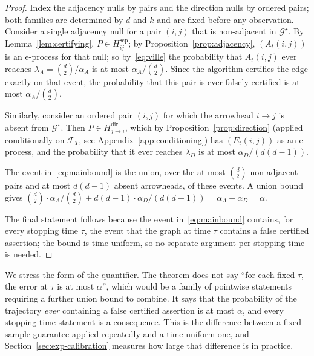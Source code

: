 \documentclass[pdflatex,sn-apa]{sn-jnl}
\theoremstyle{thmstyleone}%
\theoremstyle{thmstyletwo}%
\theoremstyle{thmstylethree}%
\newcommand{\Fcal}{\mathcal{F}}
\newcommand{\Gstar}{\mathcal{G}^{\star}}
\begin{document}
\begin{proof}
Index the adjacency nulls by pairs and the direction nulls by ordered pairs;
both families are determined by $d$ and $k$ and are fixed before any
observation. Consider a single adjacency null for a pair $(i,j)$ that is
non-adjacent in $\Gstar$. By Lemma~\ref{lem:certifying}, $P \in
H^{\mathrm{sep}}_{ij}$; by Proposition~\ref{prop:adjacency}, $(A_t(i,j))$ is
an e-process for that null; so by~\eqref{eq:ville} the probability that
$A_t(i,j)$ ever reaches $\lambda_A = \binom{d}{2}/\alpha_A$ is at most
$\alpha_A / \binom{d}{2}$. Since the algorithm certifies the edge exactly on
that event, the probability that this pair is ever falsely certified is at
most $\alpha_A/\binom{d}{2}$.

Similarly, consider an ordered pair $(i,j)$ for which the arrowhead $i \to j$
is absent from $\Gstar$. Then $P \in H^{\mathrm{dir}}_{j \to i}$, which by
Proposition~\ref{prop:direction} (applied conditionally on $\Fcal_T$, see
Appendix~\ref{app:conditioning}) has $(E_t(i,j))$ as an e-process, and the
probability that it ever reaches $\lambda_D$ is at most
$\alpha_D / (d(d-1))$.

The event in~\eqref{eq:mainbound} is the union, over the at most
$\binom{d}{2}$ non-adjacent pairs and at most $d(d-1)$ absent arrowheads, of
these events. A union bound gives
$\binom{d}{2} \cdot \alpha_A/\binom{d}{2} + d(d-1) \cdot \alpha_D/(d(d-1))
= \alpha_A + \alpha_D = \alpha$.

The final statement follows because the event in~\eqref{eq:mainbound}
contains, for every stopping time $\tau$, the event that the graph at time
$\tau$ contains a false certified assertion; the bound is time-uniform, so no
separate argument per stopping time is needed.
\end{proof}

We stress the form of the quantifier. The theorem does not say ``for each
fixed $\tau$, the error at $\tau$ is at most $\alpha$'', which would be a
family of pointwise statements requiring a further union bound to combine.
It says that the probability of the trajectory \emph{ever} containing a false
certified assertion is at most $\alpha$, and every stopping-time statement is
a consequence. This is the difference between a fixed-sample guarantee applied
repeatedly and a time-uniform one, and Section~\ref{sec:exp-calibration}
measures how large that difference is in practice.
\end{document}
